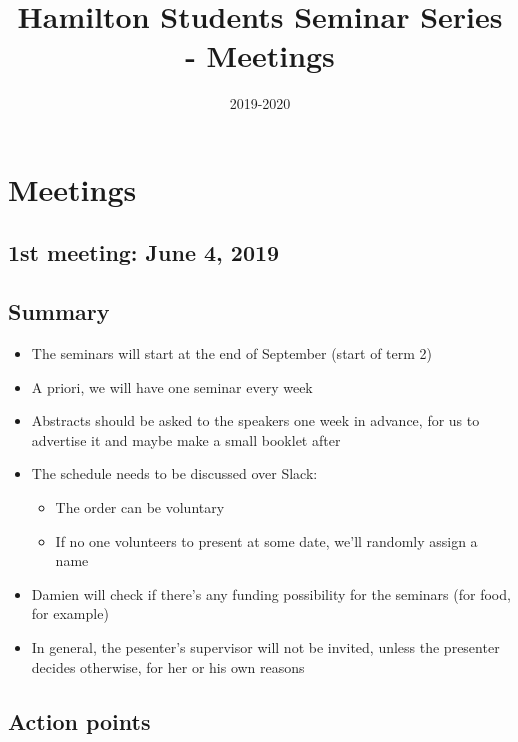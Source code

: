 \documentclass[]{article}
\title{Hamilton Students Seminar Series - Meetings}
\author{}
\date{2019-2020}
\providecommand{\tightlist}{%
  \setlength{\itemsep}{0pt}\setlength{\parskip}{0pt}}
\begin{document}
\maketitle

\hypertarget{meetings}{%
\section{Meetings}\label{meetings}}

\hypertarget{st-meeting-june-4-2019}{%
\subsection{1st meeting: June 4, 2019}\label{st-meeting-june-4-2019}}

\hypertarget{summary}{%
\subsection{Summary}\label{summary}}

\begin{itemize}
\tightlist
\item
  The seminars will start at the end of September (start of term 2)
\item
  A priori, we will have one seminar every week
\item
  Abstracts should be asked to the speakers one week in advance, for us
  to advertise it and maybe make a small booklet after
\item
  The schedule needs to be discussed over Slack:

  \begin{itemize}
  \tightlist
  \item
    The order can be voluntary
  \item
    If no one volunteers to present at some date, we'll randomly assign
    a name
  \end{itemize}
\item
  Damien will check if there's any funding possibility for the seminars
  (for food, for example)
\item
  In general, the pesenter's supervisor will not be invited, unless the
  presenter decides otherwise, for her or his own reasons
\end{itemize}

\hypertarget{action-points}{%
\subsection{Action points}\label{action-points}}
\end{document}

